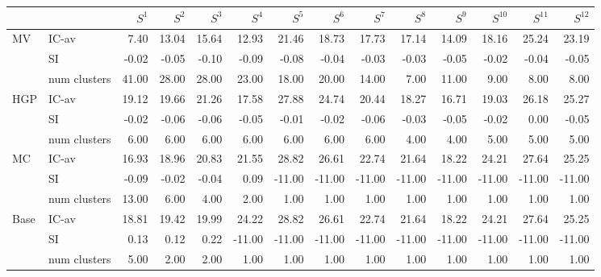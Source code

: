 \begin{tabular}{llrrrrrrrrrrrr}
\toprule
 &  & $S^{1}$ & $S^{2}$ & $S^{3}$ & $S^{4}$ & $S^{5}$ & $S^{6}$ & $S^{7}$ & $S^{8}$ & $S^{9}$ & $S^{10}$ & $S^{11}$ & $S^{12}$ \\
\midrule
\multirow[c]{3}{*}{MV} & IC-av & 7.40 & 13.04 & 15.64 & 12.93 & 21.46 & 18.73 & 17.73 & 17.14 & 14.09 & 18.16 & 25.24 & 23.19 \\
 & SI & -0.02 & -0.05 & -0.10 & -0.09 & -0.08 & -0.04 & -0.03 & -0.03 & -0.05 & -0.02 & -0.04 & -0.05 \\
 & num clusters & 41.00 & 28.00 & 28.00 & 23.00 & 18.00 & 20.00 & 14.00 & 7.00 & 11.00 & 9.00 & 8.00 & 8.00 \\
\multirow[c]{3}{*}{HGP} & IC-av & 19.12 & 19.66 & 21.26 & 17.58 & 27.88 & 24.74 & 20.44 & 18.27 & 16.71 & 19.03 & 26.18 & 25.27 \\
 & SI & -0.02 & -0.06 & -0.06 & -0.05 & -0.01 & -0.02 & -0.06 & -0.03 & -0.05 & -0.02 & 0.00 & -0.05 \\
 & num clusters & 6.00 & 6.00 & 6.00 & 6.00 & 6.00 & 6.00 & 6.00 & 4.00 & 4.00 & 5.00 & 5.00 & 5.00 \\
\multirow[c]{3}{*}{MC} & IC-av & 16.93 & 18.96 & 20.83 & 21.55 & 28.82 & 26.61 & 22.74 & 21.64 & 18.22 & 24.21 & 27.64 & 25.25 \\
 & SI & -0.09 & -0.02 & -0.04 & 0.09 & -11.00 & -11.00 & -11.00 & -11.00 & -11.00 & -11.00 & -11.00 & -11.00 \\
 & num clusters & 13.00 & 6.00 & 4.00 & 2.00 & 1.00 & 1.00 & 1.00 & 1.00 & 1.00 & 1.00 & 1.00 & 1.00 \\
\multirow[c]{3}{*}{Base} & IC-av & 18.81 & 19.42 & 19.99 & 24.22 & 28.82 & 26.61 & 22.74 & 21.64 & 18.22 & 24.21 & 27.64 & 25.25 \\
 & SI & 0.13 & 0.12 & 0.22 & -11.00 & -11.00 & -11.00 & -11.00 & -11.00 & -11.00 & -11.00 & -11.00 & -11.00 \\
 & num clusters & 5.00 & 2.00 & 2.00 & 1.00 & 1.00 & 1.00 & 1.00 & 1.00 & 1.00 & 1.00 & 1.00 & 1.00 \\
\bottomrule
\end{tabular}
